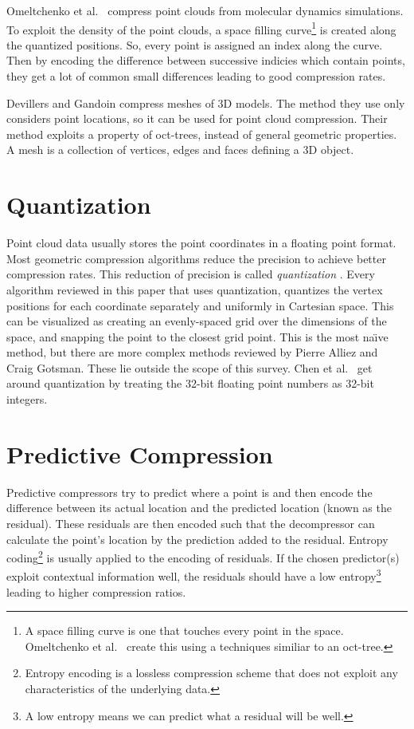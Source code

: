 \documentclass[11pt,twocolumn]{article}
\begin{document}
Omeltchenko et al.~\cite{omeltchenko2000sls} compress point clouds from
molecular dynamics simulations. To exploit the density of the point clouds, a
space filling curve\footnote{A space filling curve is one that touches every
  point in the space. Omeltchenko et al.~\cite{omeltchenko2000sls} create this
  using a techniques similiar to an oct-tree.} is created along the quantized
positions. So, every point is assigned an index along the curve. Then by
encoding the difference between successive indicies which contain points, they
get a lot of common small differences leading to good compression rates.

Devillers and Gandoin \cite{devillers2000gci} compress meshes of 3D
models. The method they use only considers point locations, so it can be used
for point cloud compression. Their method exploits a property of oct-trees,
instead of general geometric properties. A mesh is a collection of vertices,
edges and faces defining a 3D object.


\section{Quantization}

Point cloud data usually stores the point coordinates in a floating point
format. Most geometric compression algorithms reduce the precision to achieve
better compression rates. This reduction of precision is called
\emph{quantization} \cite{ag-racm-03}. Every algorithm reviewed in this paper
that uses quantization, quantizes the vertex positions for each coordinate
separately and uniformly in Cartesian space. This can be visualized as
creating an evenly-spaced grid over the dimensions of the space, and snapping
the point to the closest grid point. This is the most na\"{\i}ve method, but
there are more complex methods reviewed by Pierre Alliez and Craig
Gotsman\cite{ag-racm-03}. These lie outside the scope of this survey. Chen et
al.~\cite{chen2005lcp} get around quantization by treating the 32-bit floating
point numbers as 32-bit integers.


\section{Predictive Compression}

Predictive compressors try to predict where a point is and then encode the
difference between its actual location and the predicted location (known as
the residual). These residuals are then encoded such that the decompressor can
calculate the point's location by the prediction added to the
residual. Entropy coding\footnote{Entropy encoding is a lossless compression
  scheme that does not exploit any characteristics of the underlying data.} is
usually applied to the encoding of residuals. If the chosen predictor(s)
exploit contextual information well, the residuals should have a low
entropy\footnote{A low entropy means we can predict what a residual will be
  well.}  leading to higher compression ratios.
\end{document}

